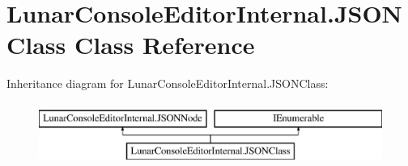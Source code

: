\hypertarget{class_lunar_console_editor_internal_1_1_j_s_o_n_class}{}\section{Lunar\+Console\+Editor\+Internal.\+J\+S\+O\+N\+Class Class Reference}
\label{class_lunar_console_editor_internal_1_1_j_s_o_n_class}
Inheritance diagram for Lunar\+Console\+Editor\+Internal.\+J\+S\+O\+N\+Class\+:\begin{figure}[H]
\begin{center}
\leavevmode
\includegraphics[height=2.000000cm]{class_lunar_console_editor_internal_1_1_j_s_o_n_class}
\end{center}
\end{figure}
